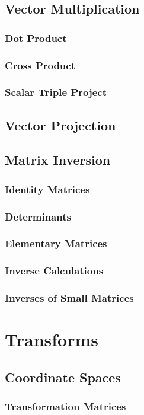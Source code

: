 \documentclass[a4paper,10pt]{article}
\begin{document}
\subsection{Vector Multiplication}
\subsubsection{Dot Product}
\subsubsection{Cross Product}
\subsubsection{Scalar Triple Project}
\subsection{Vector Projection}
\subsection{Matrix Inversion}
\subsubsection{Identity Matrices}
\subsubsection{Determinants}
\subsubsection{Elementary Matrices}
\subsubsection{Inverse Calculations}
\subsubsection{Inverses of Small Matrices}
\section{Transforms}
\subsection{Coordinate Spaces}
\subsubsection{Transformation Matrices}
\end{document}
